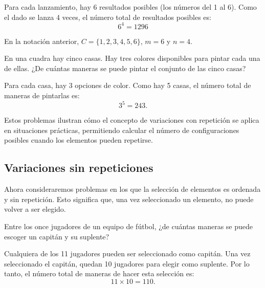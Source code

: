 \documentclass[12pt,a4paper]{book}
\begin{document}
    \begin{solucion}
        Para cada lanzamiento, hay 6 resultados posibles (los números del 1 al 6). Como el dado se lanza 4 veces, el número total de resultados posibles es:
        \begin{equation*}
            6^{4}=1296
        \end{equation*}
    \end{solucion}

    En la notación anterior, $C=\{1,2,3,4,5,6\}$, $m=6$ y $n=4$.

    \begin{mdframed}[style=mdgraybox,frametitle={Problema 14: Pintura de casas}]
        En una cuadra hay cinco casas. Hay tres colores disponibles para pintar cada una de ellas. ¿De cuántas maneras se puede pintar el conjunto de las cinco casas?
    \end{mdframed}

    \begin{solucion}
        Para cada casa, hay 3 opciones de color. Como hay 5 casas, el número total de maneras de pintarlas es:
        \begin{equation*}
            3^{5}=243.
        \end{equation*}
    \end{solucion}
    Estos problemas ilustran cómo el concepto de variaciones con repetición se aplica en situaciones prácticas, permitiendo calcular el número de configuraciones posibles cuando los elementos pueden repetirse.

    \subsection{Variaciones sin repeticiones}

    Ahora consideraremos problemas en los que la selección de elementos es ordenada y sin repetición. Esto significa que, una vez seleccionado un elemento, no puede volver a ser elegido.

    \begin{mdframed}[style=mdgraybox,frametitle={Problema 15: Selección de capitán y suplente}]
        Entre los once jugadores de un equipo de fútbol, ¿de cuántas maneras se puede escoger un capitán y su suplente?
    \end{mdframed}

    \begin{solucion}
        Cualquiera de los 11 jugadores pueden ser seleccionado como capitán. Una vez seleccionado el capitán, quedan 10 jugadores para elegir como suplente. Por lo tanto, el número total de maneras de hacer esta selección es:
        \begin{equation*}
            11\times10=110.
        \end{equation*}
    \end{solucion}
\end{document}
